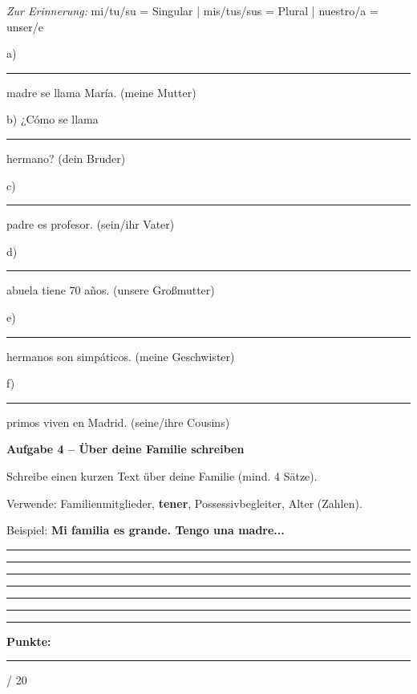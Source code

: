 \documentclass[11pt, a4paper]{article}
\newcommand{\fachfarbe}{spanisch}
\newcommand{\maxpunkte}{20}
\newcommand{\punktebox}[1]{\hfill\fbox{\small \_/#1}}
\newcommand{\luecke}[1]{\rule{#1}{0.4pt}}
\newenvironment{aufgabe}[1]{%
    \needspace{5\baselineskip}%
    \nopagebreak[4]%
    \vspace{10pt}
    \noindent\textbf{\textcolor{\fachfarbe}{Aufgabe #1}}
    \nopagebreak[4]%
    \vspace{5pt}
    \nopagebreak[4]%
    \begin{list}{}{\leftmargin=0pt}
    \item[]
}{%
    \end{list}
}
\newcommand{\es}[1]{\textcolor{\fachfarbe}{\textbf{#1}}}
\begin{document}
\begin{vokabelkasten}
\textit{Zur Erinnerung:} mi/tu/su = Singular | mis/tus/sus = Plural | nuestro/a = unser/e
\end{vokabelkasten}

\vspace{0.5em}

\noindent
a) \luecke{2cm} madre se llama María. \hfill (meine Mutter)

\vspace{0.8em}

\noindent
b) ¿Cómo se llama \luecke{2cm} hermano? \hfill (dein Bruder)

\vspace{0.8em}

\noindent
c) \luecke{2cm} padre es profesor. \hfill (sein/ihr Vater)

\vspace{0.8em}

\noindent
d) \luecke{2cm} abuela tiene 70 años. \hfill (unsere Großmutter)

\vspace{0.8em}

\noindent
e) \luecke{2cm} hermanos son simpáticos. \hfill (meine Geschwister)

\vspace{0.8em}

\noindent
f) \luecke{2cm} primos viven en Madrid. \hfill (seine/ihre Cousins)

\vspace{15pt}


\begin{aufgabe}{4 -- Über deine Familie schreiben}
Schreibe einen kurzen Text über deine Familie (mind. 4 Sätze). \punktebox{6}
\end{aufgabe}

\begin{hinweis}
Verwende: Familienmitglieder, \es{tener}, Possessivbegleiter, Alter (Zahlen).

Beispiel: \es{Mi familia es grande. Tengo una madre...}
\end{hinweis}

\vspace{0.5em}

\noindent\rule{\textwidth}{0.4pt}\vspace{8pt}
\noindent\rule{\textwidth}{0.4pt}\vspace{8pt}
\noindent\rule{\textwidth}{0.4pt}\vspace{8pt}
\noindent\rule{\textwidth}{0.4pt}\vspace{8pt}
\noindent\rule{\textwidth}{0.4pt}\vspace{8pt}
\noindent\rule{\textwidth}{0.4pt}


\vspace{20pt}
\hrule
\vspace{10pt}

\begin{flushright}
\textbf{Punkte:} \luecke{1cm} / \maxpunkte
\end{flushright}
\end{document}
